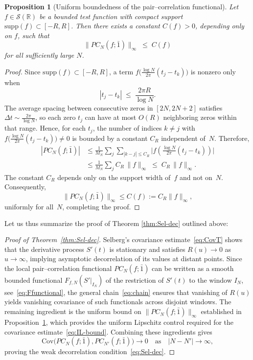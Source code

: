 \documentclass[12pt,reqno]{amsart}
\theoremstyle{plain}
\newtheorem{prop}{Proposition}[section]
\theoremstyle{definition}
\theoremstyle{remark}
\begin{document}
\begin{prop}[Uniform boundedness of the pair--correlation functional] 
\label{prop:bound-norm}
Let $f\in\mathcal{S}(\mathbb{R})$ be a bounded test function with compact support 
$\mathrm{supp}(f)\subset[-R,R]$.  Then there exists a constant $C(f)>0$, depending only on $f$, 
such that
\begin{equation}
\|PC_N(f;\bar{1})\|_\infty \;\le\; C(f)
\end{equation}
for all sufficiently large $N$.  
\end{prop}

\begin{proof}
Since $\mathrm{supp}(f)\subset[-R,R]$, a term 
$f\!\big(\tfrac{\log N}{2\pi}(t_j-t_k)\big)$ is nonzero only when 
\[
|t_j-t_k|\;\le\;\frac{2\pi R}{\log N}.
\]
The average spacing between consecutive zeros in $[2N,2N+2]$ satisfies 
$\Delta t \sim \frac{2\pi}{\log N}$, so each zero $t_j$ can have 
at most $O(R)$ neighboring zeros within that range.
Hence, for each $t_j$, the number of indices $k\neq j$ with 
$f\!\big(\tfrac{\log N}{2\pi}(t_j-t_k)\big)\neq0$ is bounded by a constant $C_R$ 
independent of~$N$.
Therefore,
\begin{align}
|PC_N(f;\bar{1})|
&\le \frac{1}{M_N}\sum_{j}\sum_{|k-j|\le C_R}
\big|f\!\left(\tfrac{\log N}{2\pi}(t_j-t_k)\right)\big|  \\
&\le \frac{1}{M_N}\sum_{j} C_R\,\|f\|_\infty
\;\le\; C_R\,\|f\|_\infty.
\end{align}
The constant $C_R$ depends only on the support width of~$f$ and not on~$N$.
Consequently, 
\begin{equation}
\|PC_N(f;\bar{1})\|_\infty\le C(f):=C_R\|f\|_\infty, 
\end{equation}
uniformly for all~$N$, completing the proof.
\end{proof}
Let us thus summarize the proof of Theorem \ref{thm:Sel-dec} outlined above:

\begin{proof}[Proof of Theorem~\ref{thm:Sel-dec}]
Selberg’s covariance estimate~\eqref{eq:CovT} shows that the derivative process \(S'(t)\) is stationary and satisfies \(R(u)\to0\) as \(u\to\infty\), implying asymptotic decorrelation of its values at distant points.  
Since the local pair–correlation functional \(PC_N(f;\bar1)\) can be written as a smooth bounded functional \(F_{f,N}(S'|_{I_N})\) of the restriction of \(S'(t)\) to the window \(I_N\), see~\eqref{eq:Ffunctional}, the general chain~\eqref{eq:chain} ensures that vanishing of \(R(u)\) yields vanishing covariance of such functionals across disjoint windows.  
The remaining ingredient is the uniform bound on \(\|PC_N(f;\bar1)\|_\infty\) established in Proposition~\ref{prop:bound-norm}, which provides the uniform Lipschitz control required for the covariance estimate~\eqref{eq:IL-bound}.  
Combining these ingredients gives 
\[
\mathrm{Cov}\!\bigl(PC_N(f;\bar1),PC_{N'}(f;\bar1)\bigr)\to0
\quad\text{as}\quad |N-N'|\to\infty,
\]
proving the weak decorrelation condition~\eqref{eq:Sel-dec}.
\end{proof}
 
\end{document}
